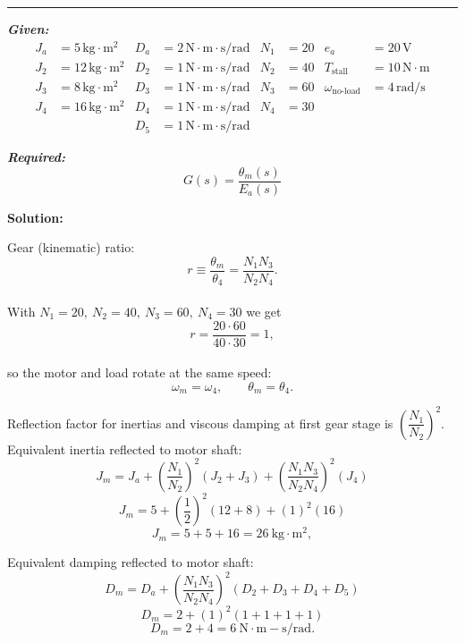 ﻿\documentclass[11pt]{article}
\begin{document}
\noindent\rule{\textwidth}{1pt}

\vspace{12pt}

\noindent\textbf{\textit{Given:}}
\[
\begin{aligned}
J_a &= 5\, \text{kg}\cdot\text{m}^2 & D_a &= 2\, \text{N}\cdot\text{m}\cdot\text{s/rad} & N_1 &= 20 & e_a &= 20\,\text{V} \\
J_2 &= 12\, \text{kg}\cdot\text{m}^2 & D_2 &= 1\, \text{N}\cdot\text{m}\cdot\text{s/rad} & N_2 &= 40 & T_{\text{stall}} &= 10\,\text{N}\cdot\text{m} \\
J_3 &= 8\, \text{kg}\cdot\text{m}^2 & D_3 &= 1\, \text{N}\cdot\text{m}\cdot\text{s/rad} & N_3 &= 60 & \omega_{\text{no-load}} &= 4\,\text{rad/s} \\
J_4 &= 16\, \text{kg}\cdot\text{m}^2 & D_4 &= 1\, \text{N}\cdot\text{m}\cdot\text{s/rad} & N_4 &= 30 & & \\
& & D_5 &= 1\, \text{N}\cdot\text{m}\cdot\text{s/rad} & & & &
\end{aligned}
\]

\vspace{12pt}

\noindent\textbf{\textit{Required:}}
\[
G(s) = \frac{\theta_m(s)}{E_a(s)}
\]

\vspace{12pt}

\noindent \textbf{Solution:}

Gear (kinematic) ratio:
\[
r \equiv \frac{\theta_m}{\theta_4}=\frac{N_1 N_3}{N_2 N_4}.
\]  \\

With \(N_1=20,\ N_2=40,\ N_3=60,\ N_4=30\) we get
\[
r=\frac{20 \cdot 60}{40 \cdot 30}=1,
\] \\

so the motor and load rotate at the same speed:
\[
\omega_m = \omega_4,\qquad \theta_m = \theta_4.
\]

Reflection factor for inertias and viscous damping at first gear stage is \(\left(\dfrac{N_1}{N_2}\right)^2\). \\

Equivalent inertia reflected to motor shaft:
\[
J_m = J_a + \left(\frac{N_1}{N_2}\right)^2 (J_2 + J_3) + \left(\frac{N_1 N_3}{N_2 N_4}\right)^2 (J_4)
\]
\[
J_m = 5 + \left(\frac{1}{2}\right)^2 (12 + 8) + (1)^2 (16)
\]
\[
J_m = 5 + 5 + 16 = 26\ \mathrm{kg\cdot m^2},
\]

Equivalent damping reflected to motor shaft:
\[
D_m = D_a + \left(\frac{N_1 N_3}{N_2 N_4}\right)^2 (D_2 + D_3 + D_4 + D_5)
\]
\[
D_m = 2 + (1)^2 (1 + 1 + 1 + 1)
\]
\[
D_m = 2 + 4 = 6\ \mathrm{N\cdot m\!-\!s/rad}.
\]
\end{document}
